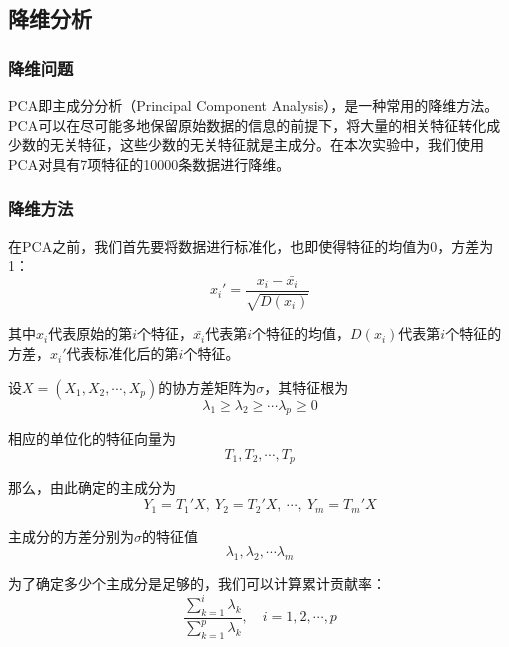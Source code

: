 \documentclass[UTF8]{ctexart}
\begin{document}
	\subsection{降维分析} 
	
	\subsubsection{降维问题} 
	
	PCA即主成分分析（Principal Component Analysis），是一种常用的降维方法。PCA可以在尽可能多地保留原始数据的信息的前提下，将大量的相关特征转化成少数的无关特征，这些少数的无关特征就是主成分。在本次实验中，我们使用PCA对具有7项特征的10000条数据进行降维。
	
	\subsubsection{降维方法}
	
	在PCA之前，我们首先要将数据进行标准化，也即使得特征的均值为0，方差为1：
	\begin{equation*}
	x_i' = \frac{x_i - \bar{x_i}}{\sqrt{D(x_i)}}
	\end{equation*}
	
	其中$x_i$代表原始的第$i$个特征，$\bar{x_i}$代表第$i$个特征的均值，$D(x_i)$代表第$i$个特征的方差，$x_i'$代表标准化后的第$i$个特征。
	
	设$X = (X_1, X_2, \cdots, X_p)$的协方差矩阵为$\sigma$，其特征根为
	\begin{equation*}
	\lambda_1 \geq \lambda_2 \geq \cdots \lambda_p \geq 0
	\end{equation*}
	
	相应的单位化的特征向量为
	\begin{equation*}
	T_1, T_2, \cdots, T_p
	\end{equation*}
	
	那么，由此确定的主成分为
	\begin{equation*}
	Y_1 = T_1'X, \ Y_2 = T_2'X, \ \cdots, \ Y_m = T_m'X
	\end{equation*}
	
	主成分的方差分别为$\sigma$的特征值
	\begin{equation*}
	\lambda_1, \lambda_2, \cdots \lambda_m
	\end{equation*}
	
	为了确定多少个主成分是足够的，我们可以计算累计贡献率：
	\begin{equation*}
	\frac{\sum\limits_{k=1}^{i} \lambda_k}{\sum\limits_{k=1}^{p} \lambda_k}, \quad i=1,2,\cdots, p
	\end{equation*}
	
\end{document}
